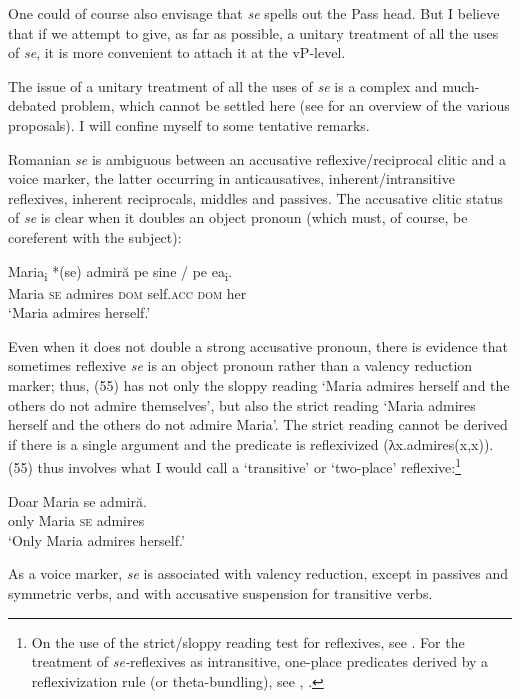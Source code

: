 \documentclass[output=paper]{langsci/langscibook}
\begin{document}
One could of course also envisage that \textit{se} spells out the Pass head. But I believe that if we attempt to give, as far as possible, a unitary treatment of all the uses of \textit{se}, it is more convenient to  attach it at the vP-level.

The issue of a unitary treatment of all the uses of \textit{se} is a complex and much-debated problem, which cannot be settled here (see \citealt{Dobrovie-Sorin2017} for an overview of the various proposals). I will confine myself to some tentative remarks.

Romanian \textit{se} is ambiguous between an accusative reflexive/reciprocal clitic and a voice marker, the latter occurring in anticausatives, inherent/intransitive reflexives, inherent reciprocals, middles and passives. The accusative clitic status of \textit{se} is clear when it doubles an object pronoun (which must, of course, be coreferent with the subject):

\ea%
    \label{ex:giurgea:54}
    \gll Maria\textsubscript{i} *(se) admiră  pe    sine        / pe    ea\textsubscript{i}.\\
         Maria     \textsc{se} admires \textsc{dom} self.\textsc{acc}  \textsc{dom} her\\
    \glt ‘Maria admires herself.’
    \z

Even when it does not double a strong accusative pronoun, there is evidence that sometimes reflexive \textit{se} is an object pronoun rather than a valency reduction marker; thus, (55) has not only the sloppy reading ‘Maria admires herself and the others do not admire themselves’, but also the strict reading ‘Maria admires herself and the others do not admire Maria’. The strict reading cannot be derived if there is a single argument and the predicate is reflexivized (λx.admires(x,x)). (55) thus involves what I would call a ‘transitive’ or ‘two-place’ reflexive:\footnote{On the use of the strict/sloppy reading test for reflexives, see \citet{Sells1987,Labelle2008}. For the treatment of \textit{se-}reflexives as intransitive, one-place predicates derived by a reflexivization rule (or theta-bundling), see \citet{Reinhart2005}, \citet{Labelle2008}.}   

\ea%
    \label{ex:giurgea:55}
    \gll Doar  Maria se admiră.       \\
         only   Maria \textsc{se} admires          \\
    \glt ‘Only Maria admires herself.’
    \z

As a voice marker, \textit{se} is associated with valency reduction, except in passives and symmetric verbs, and with accusative suspension for transitive verbs.
\end{document}
